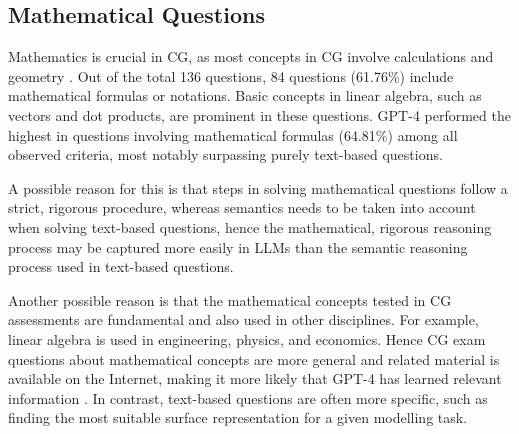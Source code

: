 \documentclass[sigconf,review]{acmart}
\begin{document}

\subsection{Mathematical Questions}

Mathematics is crucial in CG, as most concepts in CG involve calculations and geometry \cite{Suselo2017,Balreira2018}. Out of the total 136 questions, 84 questions (61.76\%) include mathematical formulas or notations. Basic concepts in linear algebra, such as vectors and dot products, are prominent in these questions. GPT-4 performed the highest in questions involving mathematical formulas (64.81\%) among all observed criteria, most notably surpassing purely text-based questions.

A possible reason for this is that steps in solving mathematical questions follow a strict, rigorous procedure, whereas semantics needs to be taken into account when solving text-based questions, hence the mathematical, rigorous reasoning process may be captured more easily in LLMs than the semantic reasoning process used in text-based questions.

Another possible reason is that the mathematical concepts tested in CG assessments are fundamental and also used in other disciplines. For example, linear algebra is used in engineering, physics, and economics. Hence CG exam questions about mathematical concepts are more general and related material is available on the Internet, making it more likely that GPT-4 has learned relevant information \cite{gpt3}. In contrast, text-based questions are often more specific, such as finding the most suitable surface representation for a given modelling task. 
\end{document}
